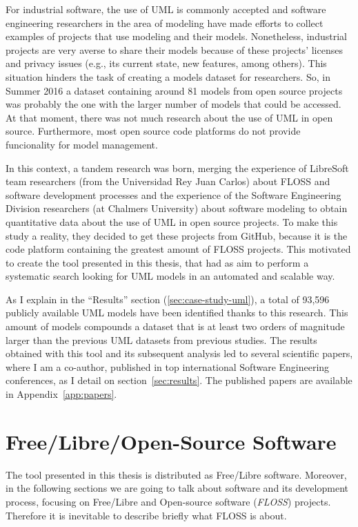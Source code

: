 \documentclass[a4paper, 12pt]{book}
\begin{document}
For industrial software, the use of UML is commonly accepted and software engineering researchers in the area of modeling
have made efforts to collect examples of projects that use modeling and their models. Nonetheless, industrial projects
are very averse to share their models because of these projects' licenses and privacy issues (e.g., its current
state, new features, among others).
This situation hinders the task of creating a models dataset for researchers. So, in Summer 2016 a dataset
containing around 81 models from open source projects was probably the one with the larger number of models that could be accessed. At that moment, there was not much research about the use of UML in open source.
Furthermore, most open source code platforms do not provide funcionality for model management.

In this context, a tandem research was born, merging the experience of LibreSoft team researchers (from the Universidad Rey Juan Carlos) about
FLOSS and software development processes and the experience of the Software Engineering Division researchers (at Chalmers University)
about software modeling to obtain quantitative data about the use of UML in open source projects. To make this study a reality, they
decided to get these projects from GitHub, because it is the code platform containing the greatest amount of FLOSS projects.
This motivated to create the tool presented in this thesis, that had as aim to perform a systematic search looking for UML models in
an automated and scalable way.

As I explain in the ``Results'' section (\ref{sec:case-study-uml}), a total of 93,596 publicly available UML models have been identified thanks to this research.
This amount of models compounds a dataset that is at least two orders of magnitude larger than the previous UML datasets from previous studies. The results
obtained with this tool and its subsequent analysis led to several scientific papers, where I am a co-author, published in top international Software Engineering conferences, as I detail on section~\ref{sec:results}. The published papers are available in Appendix~\ref{app:papers}.

\section{Free/Libre/Open-Source Software}
\label{sec:floss-definition}

The tool presented in this thesis is distributed as Free/Libre software. Moreover, in the following sections we are going
to talk about software and its development process, focusing on Free/Libre and Open-source
software (\emph{FLOSS}) projects. Therefore it is inevitable to describe briefly what FLOSS is about.
\end{document}
